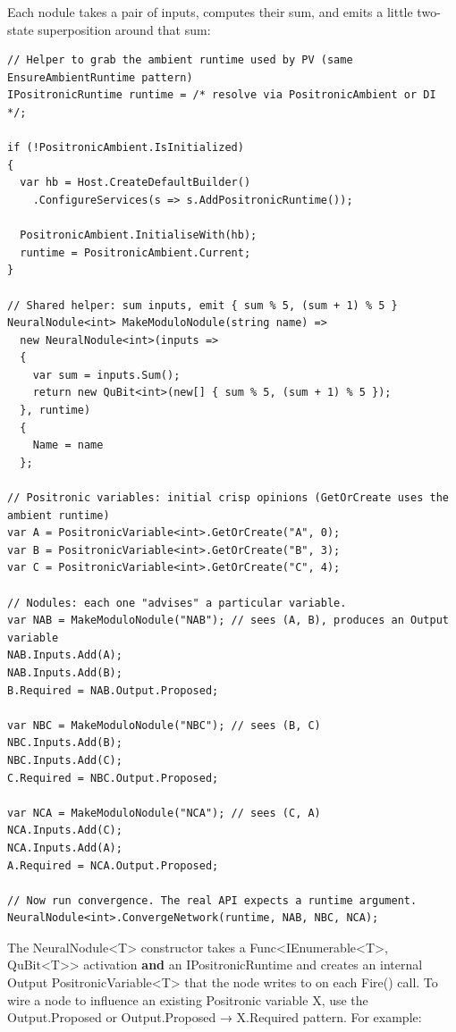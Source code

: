 \documentclass[a4paper,11pt]{article}
\begin{document}
Each nodule takes a pair of inputs, computes their sum, and emits a little two-state superposition around that sum:

\begin{lstlisting}[style=codeblock]
// Helper to grab the ambient runtime used by PV (same EnsureAmbientRuntime pattern)
IPositronicRuntime runtime = /* resolve via PositronicAmbient or DI */;

if (!PositronicAmbient.IsInitialized)
{
  var hb = Host.CreateDefaultBuilder()
    .ConfigureServices(s => s.AddPositronicRuntime());

  PositronicAmbient.InitialiseWith(hb);
  runtime = PositronicAmbient.Current;
}

// Shared helper: sum inputs, emit { sum % 5, (sum + 1) % 5 }
NeuralNodule<int> MakeModuloNodule(string name) =>
  new NeuralNodule<int>(inputs =>
  {
    var sum = inputs.Sum();
    return new QuBit<int>(new[] { sum % 5, (sum + 1) % 5 });
  }, runtime)
  {
    Name = name
  };

// Positronic variables: initial crisp opinions (GetOrCreate uses the ambient runtime)
var A = PositronicVariable<int>.GetOrCreate("A", 0);
var B = PositronicVariable<int>.GetOrCreate("B", 3);
var C = PositronicVariable<int>.GetOrCreate("C", 4);

// Nodules: each one "advises" a particular variable.
var NAB = MakeModuloNodule("NAB"); // sees (A, B), produces an Output variable
NAB.Inputs.Add(A);
NAB.Inputs.Add(B);
B.Required = NAB.Output.Proposed;

var NBC = MakeModuloNodule("NBC"); // sees (B, C)
NBC.Inputs.Add(B);
NBC.Inputs.Add(C);
C.Required = NBC.Output.Proposed;

var NCA = MakeModuloNodule("NCA"); // sees (C, A)
NCA.Inputs.Add(C);
NCA.Inputs.Add(A);
A.Required = NCA.Output.Proposed;

// Now run convergence. The real API expects a runtime argument.
NeuralNodule<int>.ConvergeNetwork(runtime, NAB, NBC, NCA);
\end{lstlisting}

The NeuralNodule\textless T\textgreater{} constructor takes a Func\textless IEnumerable\textless T\textgreater, QuBit\textless T\textgreater\textgreater{} activation \textbf{and} an IPositronicRuntime and creates an internal Output PositronicVariable\textless T\textgreater{} that the node writes to on each Fire() call. To wire a node to influence an existing Positronic variable X, use the Output.Proposed or Output.Proposed → X.Required pattern. For example:
\end{document}
